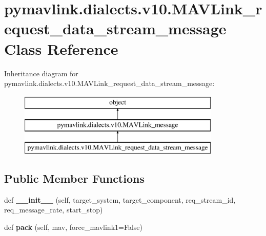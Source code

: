 \hypertarget{classpymavlink_1_1dialects_1_1v10_1_1MAVLink__request__data__stream__message}{}\section{pymavlink.\+dialects.\+v10.\+M\+A\+V\+Link\+\_\+request\+\_\+data\+\_\+stream\+\_\+message Class Reference}
\label{classpymavlink_1_1dialects_1_1v10_1_1MAVLink__request__data__stream__message}
Inheritance diagram for pymavlink.\+dialects.\+v10.\+M\+A\+V\+Link\+\_\+request\+\_\+data\+\_\+stream\+\_\+message\+:\begin{figure}[H]
\begin{center}
\leavevmode
\includegraphics[height=3.000000cm]{classpymavlink_1_1dialects_1_1v10_1_1MAVLink__request__data__stream__message}
\end{center}
\end{figure}
\subsection*{Public Member Functions}
\begin{DoxyCompactItemize}
\item 
\mbox{\label{classpymavlink_1_1dialects_1_1v10_1_1MAVLink__request__data__stream__message_a4b1d269637caccb878f51992f3a57430}} 
def {\bfseries \+\_\+\+\_\+init\+\_\+\+\_\+} (self, target\+\_\+system, target\+\_\+component, req\+\_\+stream\+\_\+id, req\+\_\+message\+\_\+rate, start\+\_\+stop)
\item 
\mbox{\label{classpymavlink_1_1dialects_1_1v10_1_1MAVLink__request__data__stream__message_aaa61a016090d7f76c9f00bfb67974d81}} 
def {\bfseries pack} (self, mav, force\+\_\+mavlink1=False)
\end{DoxyCompactItemize}
